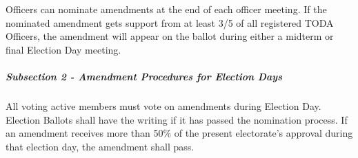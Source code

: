 \documentclass[12pt]{report}
\begin{document}
Officers can nominate amendments at the end of each officer meeting. If the nominated amendment gets support from at least 3/5 of all registered TODA Officers, the amendment will appear on the ballot during either a midterm or final Election Day meeting.\par

\subparagraph{Subsection 2 - Amendment Procedures for Election Days}
All voting active members must vote on amendments during Election Day. Election Ballots shall have the writing if it has passed the nomination process. If an amendment receives more than 50$\%$  of the present electorate’s approval during that election day, the amendment shall pass.\par


\vspace{\baselineskip}

\printbibliography
\end{document}
